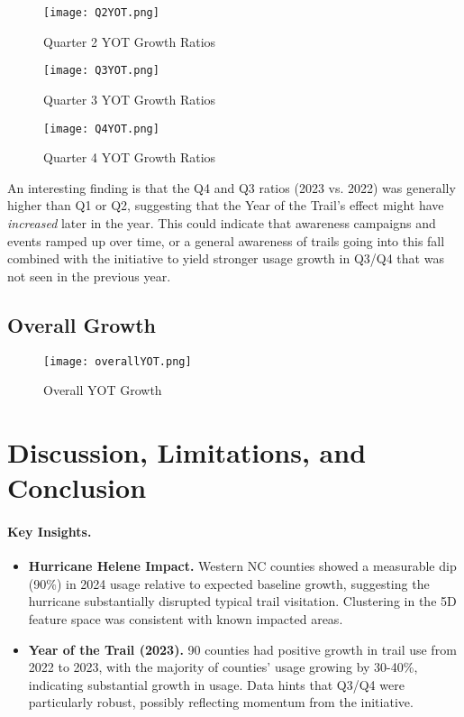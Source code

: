 \documentclass[12pt]{article}
\begin{document}
\begin{figure}[H]
    \centering
    \texttt{[image: Q2YOT.png]}
    \caption{Quarter 2 YOT Growth Ratios}
    \label{fig:enter-label}
\end{figure}

\begin{figure}[H]
    \centering
    \texttt{[image: Q3YOT.png]}
    \caption{Quarter 3 YOT Growth Ratios}
    \label{fig:enter-label}
\end{figure}

\begin{figure}[H]
    \centering
    \texttt{[image: Q4YOT.png]}
    \caption{Quarter 4 YOT Growth Ratios}
    \label{fig:enter-label}
\end{figure}

An interesting finding is that the Q4 and Q3 ratios (2023 vs. 2022) was generally higher than Q1 or Q2, suggesting that the Year of the Trail’s effect might have \emph{increased} later in the year. This could indicate that awareness campaigns and events ramped up over time, or a general awareness of trails going into this fall combined with the initiative to yield stronger usage growth in Q3/Q4 that was not seen in the previous year.

\subsection{Overall Growth}

\begin{figure}[H]
    \centering
    \texttt{[image: overallYOT.png]}
    \caption{Overall YOT Growth}
    \label{fig:enter-label}
\end{figure}

\newpage
\section{Discussion, Limitations, and Conclusion}

\paragraph{Key Insights.}
\begin{itemize}
    \item \textbf{Hurricane Helene Impact.} Western NC counties showed a measurable dip (90\%) in 2024 usage relative to expected baseline growth, suggesting the hurricane substantially disrupted typical trail visitation. Clustering in the 5D feature space was consistent with known impacted areas.
    \item \textbf{Year of the Trail (2023).} 90 counties had positive growth in trail use from 2022 to 2023, with the majority of counties' usage growing by 30-40\%, indicating substantial growth in usage. Data hints that Q3/Q4 were particularly robust, possibly reflecting momentum from the initiative.
\end{itemize}
\end{document}
